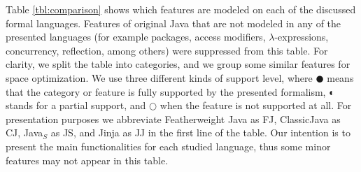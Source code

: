\documentclass[tese,capa,english]{texufpel}
\begin{document}
Table \ref{tbl:comparison} shows which features are modeled on each of the discussed formal languages. Features of original Java that are not modeled in any of the presented languages (for example packages, access modifiers, $\lambda$-expressions, concurrency, reflection, among others) were suppressed from this table. For clarity, we split the table into categories, and we group some similar features for space optimization. We use three different kinds of support level, where $\CIRCLE$ means that the category or feature is fully supported by the presented formalism, $\LEFTcircle$ stands for a partial support, and $\Circle$ when the feature is not supported at all. For presentation purposes we abbreviate Featherweight Java as FJ, ClassicJava as CJ, Java$_S$ as JS, and Jinja as JJ in the first line of the table. Our intention is to present the main functionalities for each studied language, thus some minor features may not appear in this table.
\end{document}
